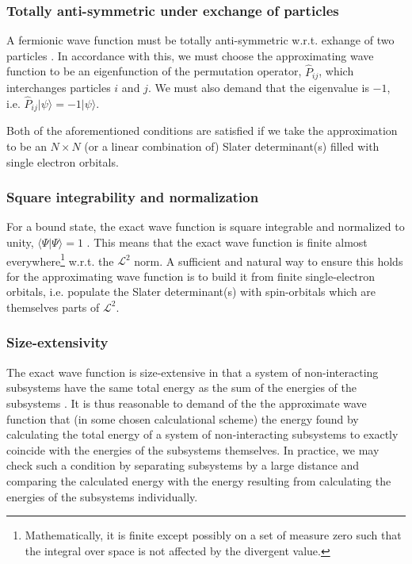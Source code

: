 \documentclass[../../master.tex]{subfiles}
\begin{document}
\subsubsection*{Totally anti-symmetric under exchange of particles}
A fermionic wave function must be totally anti-symmetric w.r.t. exhange of two particles \cite{griffiths}. In accordance with this, we must choose the approximating wave function to be an eigenfunction of the permutation operator, $\hat P_{ij}$, which interchanges particles $i$ and $j$. We must also demand that the eigenvalue is $-1$, i.e. $\hat P_{ij} |\psi\rangle = -1|\psi\rangle$. 

Both of the aforementioned conditions are satisfied if we take the approximation to be an $N \times N$ (or a linear combination of) Slater determinant(s) filled with single electron orbitals.

\subsubsection*{Square integrability and normalization}
For a bound state, the exact wave function is square integrable and normalized to unity, $\langle \Psi|\Psi\rangle = 1$ \cite{helgaker}. This means that the exact wave function is finite almost everywhere\footnote{Mathematically, it is finite except possibly on a set of measure zero such that the integral over space is not affected by the divergent value.} w.r.t. the $\mathcal{L}^2$ norm. A sufficient and natural way to ensure this holds for the approximating wave function is to build it from finite single-electron orbitals, i.e. populate the Slater determinant(s) with spin-orbitals which are themselves parts of $\mathcal{L}^2$. 

\subsubsection*{Size-extensivity}
The exact wave function is size-extensive in that a system of non-interacting subsystems have the same total energy as the sum of the energies of the subsystems \cite{helgaker}. It is thus reasonable to demand of the the approximate wave function that (in some chosen calculational scheme) the energy found by calculating the total energy of a system of non-interacting subsystems to exactly coincide with the energies of the subsystems themselves. In practice, we may check such a condition by separating subsystems by a large distance and comparing the calculated energy with the energy resulting from calculating the energies of the subsystems individually. 
\end{document}
